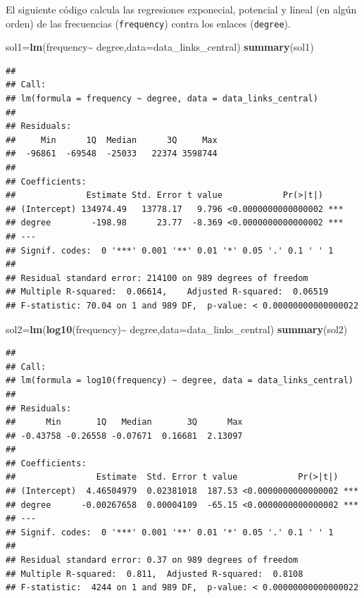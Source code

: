 \documentclass[
]{article}
\newenvironment{Shaded}{\begin{snugshade}}{\end{snugshade}}
\newcommand{\DataTypeTok}[1]{\textcolor[rgb]{0.13,0.29,0.53}{#1}}
\newcommand{\KeywordTok}[1]{\textcolor[rgb]{0.13,0.29,0.53}{\textbf{#1}}}
\newcommand{\NormalTok}[1]{#1}
\newcommand{\OperatorTok}[1]{\textcolor[rgb]{0.81,0.36,0.00}{\textbf{#1}}}
\newcommand{\StringTok}[1]{\textcolor[rgb]{0.31,0.60,0.02}{#1}}
\begin{document}
El siguiente código calcula las regresiones exponecial, potencial y
lineal (en algún orden) de las frecuencias (\texttt{frequency}) contra
los enlaces (\texttt{degree}).

\begin{Shaded}
\begin{Highlighting}[]
\NormalTok{sol1=}\KeywordTok{lm}\NormalTok{(frequency}\OperatorTok{\textasciitilde{}}\StringTok{ }\NormalTok{degree,}\DataTypeTok{data=}\NormalTok{data\_links\_central)}
\KeywordTok{summary}\NormalTok{(sol1)}
\end{Highlighting}
\end{Shaded}

\begin{verbatim}
## 
## Call:
## lm(formula = frequency ~ degree, data = data_links_central)
## 
## Residuals:
##     Min      1Q  Median      3Q     Max 
##  -96861  -69548  -25033   22374 3598744 
## 
## Coefficients:
##              Estimate Std. Error t value            Pr(>|t|)    
## (Intercept) 134974.49   13778.17   9.796 <0.0000000000000002 ***
## degree        -198.98      23.77  -8.369 <0.0000000000000002 ***
## ---
## Signif. codes:  0 '***' 0.001 '**' 0.01 '*' 0.05 '.' 0.1 ' ' 1
## 
## Residual standard error: 214100 on 989 degrees of freedom
## Multiple R-squared:  0.06614,    Adjusted R-squared:  0.06519 
## F-statistic: 70.04 on 1 and 989 DF,  p-value: < 0.00000000000000022
\end{verbatim}

\begin{Shaded}
\begin{Highlighting}[]
\NormalTok{sol2=}\KeywordTok{lm}\NormalTok{(}\KeywordTok{log10}\NormalTok{(frequency)}\OperatorTok{\textasciitilde{}}\StringTok{ }\NormalTok{degree,}\DataTypeTok{data=}\NormalTok{data\_links\_central)}
\KeywordTok{summary}\NormalTok{(sol2)}
\end{Highlighting}
\end{Shaded}

\begin{verbatim}
## 
## Call:
## lm(formula = log10(frequency) ~ degree, data = data_links_central)
## 
## Residuals:
##      Min       1Q   Median       3Q      Max 
## -0.43758 -0.26558 -0.07671  0.16681  2.13097 
## 
## Coefficients:
##                Estimate  Std. Error t value            Pr(>|t|)    
## (Intercept)  4.46504979  0.02381018  187.53 <0.0000000000000002 ***
## degree      -0.00267658  0.00004109  -65.15 <0.0000000000000002 ***
## ---
## Signif. codes:  0 '***' 0.001 '**' 0.01 '*' 0.05 '.' 0.1 ' ' 1
## 
## Residual standard error: 0.37 on 989 degrees of freedom
## Multiple R-squared:  0.811,  Adjusted R-squared:  0.8108 
## F-statistic:  4244 on 1 and 989 DF,  p-value: < 0.00000000000000022
\end{verbatim}
\end{document}
